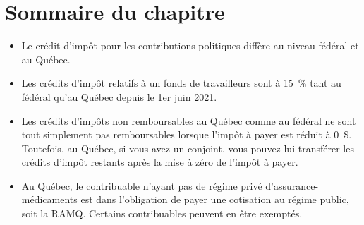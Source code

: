 \section{Sommaire du chapitre}
\begin{itemize}
	\item Le crédit d'impôt pour les contributions politiques diffère au niveau fédéral et au Québec.
	\item Les crédits d'impôt relatifs à un fonds de travailleurs sont à 15~\% tant au fédéral qu'au Québec depuis le 1er juin 2021.
	\item Les crédits d'impôts non remboursables au Québec comme au fédéral ne sont tout simplement pas remboursables lorsque l'impôt à payer est réduit à 0~\$. Toutefois, au Québec, si vous avez un conjoint, vous pouvez lui transférer les crédits d'impôt restants après la mise à zéro de l'impôt à payer.
	\item Au Québec, le contribuable n'ayant pas de régime privé d'assurance-médicaments est dans l'obligation de payer une cotisation au régime public, soit la RAMQ. Certains contribuables peuvent en être exemptés.
\end{itemize}



